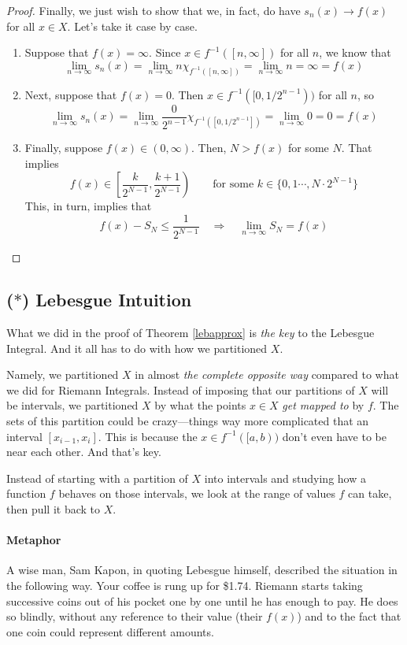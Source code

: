 \documentclass[12pt]{article}
\theoremstyle{plain}
\theoremstyle{definition}
\theoremstyle{remark}
\begin{document}
\begin{proof}
Finally, we just wish to show that we, in fact, do have $s_n(x)\rightarrow f(x)$ for all $x\in X$. Let's take it case by case.
\begin{enumerate}
\item Suppose that $f(x)=\infty$. Since $x\in f^{-1}([n,\infty])$ for all $n$, we know that 
\[
    \lim_{n\rightarrow\infty} s_n(x) = \lim_{n\rightarrow\infty}
    n\chi_{f^{-1}([n,\infty])} = \lim_{n\rightarrow\infty}
    n = \infty = f(x)
\]
\item Next, suppose that $f(x) = 0$. Then $x\in f^{-1}([0,1/2^{n-1}))$ for all $n$, so 
\[
    \lim_{n\rightarrow\infty} s_n(x) = \lim_{n\rightarrow\infty}
    \frac{0}{2^{n-1}}\chi_{f^{-1}([0,1/2^{n-1}])} = 
    \lim_{n\rightarrow\infty} 0 = 0 = f(x)
\]
\item Finally, suppose $f(x)\in(0,\infty)$. Then, $N>f(x)$ for some $N$. That implies 
\[ 
    f(x) \in \left[\frac{k}{2^{N-1}}, \frac{k+1}{2^{N-1}}\right)
        \qquad
    \text{for some $k\in\{0,1\cdots,N\cdot 2^{N-1}\}$} 
\]
This, in turn, implies that
\[
    f(x) - S_N \leq \frac{1}{2^{N-1}}
    \quad \Rightarrow\quad
    \lim_{n\rightarrow\infty}  S_N  =
    f(x)
\]
\end{enumerate}

\end{proof}

\subsection{($*$) Lebesgue Intuition}

What we did in the proof of Theorem \ref{lebapprox} is \emph{the key} to the Lebesgue Integral.  And it all has to do with how we partitioned $X$.

Namely, we partitioned $X$ in almost \emph{the complete opposite way} compared to what we did for Riemann Integrals. Instead of imposing that our partitions of $X$ will be intervals, we partitioned $X$ by what the points $x\in X$ \emph{get mapped to} by $f$. The sets of this partition could be crazy---things way more complicated that an interval $[x_{i-1}, x_i]$. This is because the $x\in f^{-1}([a,b))$ don't even have to be near each other. And that's key.

Instead of starting with a partition of $X$ into intervals and studying how a function $f$ behaves on those intervals, we look at the range of values $f$ can take, then pull it back to $X$.

\paragraph{Metaphor}
A wise man, Sam Kapon, in quoting Lebesgue himself, described the situation in the following way. Your coffee is rung up for \$1.74. Riemann starts taking successive coins out of his pocket one by one until he has enough to pay. He does so blindly, without any reference to their value (their $f(x)$) and to the fact that one coin could represent different amounts.
\end{document}
